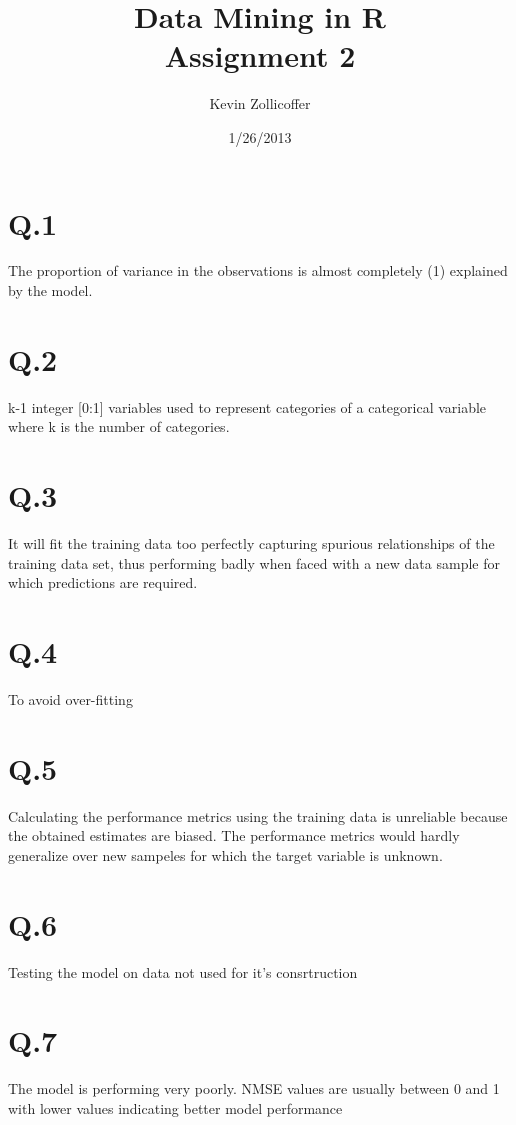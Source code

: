 \documentclass{article}
\author{Kevin Zollicoffer}
\title{Data Mining in R\\Assignment 2}
\date{1/26/2013}
\begin{document}
\maketitle


\section*{Q.1}
The proportion of variance in the observations is almost completely (1) explained by the model. 

\section*{Q.2}
k-1 integer [0:1] variables used to represent categories of a categorical variable where k is the number of categories.

\section*{Q.3}
It will fit the training data too perfectly capturing spurious relationships of the training data set, thus performing badly when faced with a new data sample for which predictions are required. 

\section*{Q.4}
To avoid over-fitting

\section*{Q.5}
Calculating the performance metrics using the training data is unreliable because the obtained estimates are biased. The performance metrics would hardly generalize over new sampeles for which the target variable is unknown. 

\section*{Q.6}
Testing the model on data not used for it's consrtruction

\section*{Q.7}
The model is performing very poorly. NMSE values are usually between 0 and 1 with lower values indicating better model performance
\end{document}
